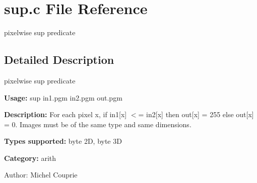 \section{sup.c File Reference}
\label{sup_8c}
pixelwise sup predicate  




\label{_details}
\subsection{Detailed Description}
pixelwise sup predicate 

{\bf Usage:} sup in1.pgm in2.pgm out.pgm

{\bf Description:} For each pixel x, if in1[x] $<$= in2[x] then out[x] = 255 else out[x] = 0. Images must be of the same type and same dimensions.

{\bf Types supported:} byte 2D, byte 3D

{\bf Category:} arith

\begin{Desc}
\item[Author:]Michel Couprie \end{Desc}
